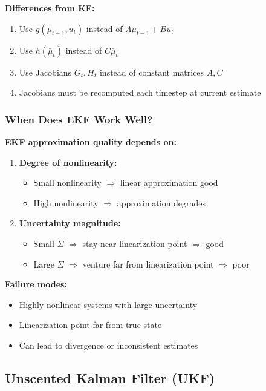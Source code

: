 \textbf{Differences from KF:}
\begin{enumerate}
    \item Use $g(\mu_{t-1}, u_t)$ instead of $A\mu_{t-1} + Bu_t$
    \item Use $h(\bar{\mu}_t)$ instead of $C\bar{\mu}_t$
    \item Use Jacobians $G_t, H_t$ instead of constant matrices $A, C$
    \item Jacobians must be recomputed each timestep at current estimate
\end{enumerate}

\subsubsection{When Does EKF Work Well?}

\textbf{EKF approximation quality depends on:}

\begin{enumerate}
\item \textbf{Degree of nonlinearity:}
\begin{itemize}
    \item Small nonlinearity $\Rightarrow$ linear approximation good
    \item High nonlinearity $\Rightarrow$ approximation degrades
\end{itemize}

\item \textbf{Uncertainty magnitude:}
\begin{itemize}
    \item Small $\Sigma$ $\Rightarrow$ stay near linearization point $\Rightarrow$ good
    \item Large $\Sigma$ $\Rightarrow$ venture far from linearization point $\Rightarrow$ poor
\end{itemize}
\end{enumerate}

\textbf{Failure modes:}
\begin{itemize}
    \item Highly nonlinear systems with large uncertainty
    \item Linearization point far from true state
    \item Can lead to divergence or inconsistent estimates
\end{itemize}

\subsection{Unscented Kalman Filter (UKF)}

